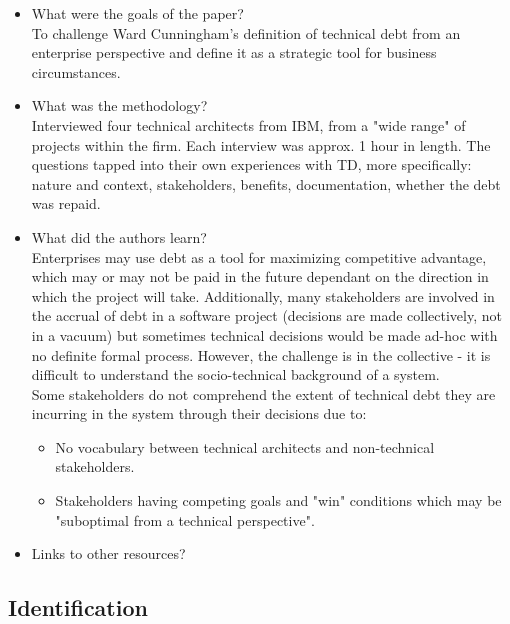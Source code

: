 \documentclass{mprop}
\begin{document}
\begin{itemize}
	\item What were the goals of the paper? \\
	To challenge Ward Cunningham's definition of technical debt from an enterprise perspective and define it as a strategic tool for business circumstances.
	\item What was the methodology? \\
	Interviewed four technical architects from IBM, from a "wide range" of projects within the firm. Each interview was approx. 1 hour in length. 
	The questions tapped into their own experiences with TD, more specifically: nature and context, stakeholders, benefits, documentation, whether the debt was repaid. 
	\item What did the authors learn? \\
	Enterprises may use debt as a tool for maximizing competitive advantage, which may or may not be paid in the future dependant on the direction in which the project will take.
	Additionally, many stakeholders are involved in the accrual of debt in a software project (decisions are made collectively, not in a vacuum) but sometimes technical decisions would be made ad-hoc with no definite formal process.
	However, the challenge is in the collective - it is difficult to understand the socio-technical background of a system. \\
	
	Some stakeholders do not comprehend the extent of technical debt they are incurring in the system through their decisions due to: 
	\begin{itemize}
		\item No vocabulary between technical architects and non-technical stakeholders.
		\item Stakeholders having competing goals and "win" conditions which may be "suboptimal from a technical perspective".
	\end{itemize} 
	\item Links to other resources?
\end{itemize}

\subsection{Identification}
\end{document}
